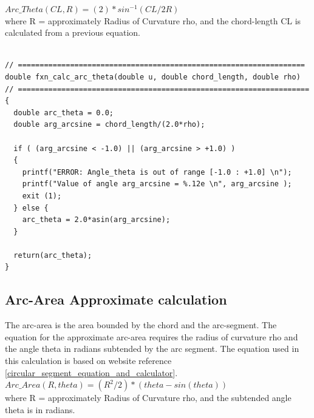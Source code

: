 $Arc\_Theta(CL, R) =  (2)*sin^{-1}(CL/2R) $\\

\noindent 
where R = approximately Radius of Curvature rho, and the chord-length CL is calculated from a previous equation.\\ 


\begin{lstlisting}[caption={Implementation of Approximate Arc-Theta Calculation}, label=Implementation of Approximate Arc-Theta Calculation]

// ==================================================================
double fxn_calc_arc_theta(double u, double chord_length, double rho)
// ===================================================================
{
  double arc_theta = 0.0; 
  double arg_arcsine = chord_length/(2.0*rho);
	
  if ( (arg_arcsine < -1.0) || (arg_arcsine > +1.0) ) 
  {
    printf("ERROR: Angle_theta is out of range [-1.0 : +1.0] \n");
    printf("Value of angle arg_arcsine = %.12e \n", arg_arcsine );
    exit (1);
  } else {
    arc_theta = 2.0*asin(arg_arcsine);
  }
	
  return(arc_theta);
}
\end{lstlisting}

\clearpage
\pagebreak

\subsection{Arc-Area Approximate calculation}
\label{chap3-Arc-Area Approximate calculation}


\noindent
The arc-area is the area bounded by the chord and the arc-segment. The equation for the approximate arc-area requires the radius of curvature rho and the angle theta in radians subtended by the arc segment. The equation  used in this calculation is based on website reference [\href{https://www.engineersedge.com/math/circular_segment_equation_and_calculator__13796.htm}{circular\_segment\_equation\_and\_calculator}]. \\

$Arc\_Area(R, theta) = (R^{2}/2)*(theta - sin(theta)) $\\

\noindent 
where R = approximately Radius of Curvature rho, and the subtended angle theta is in radians.\\ 


